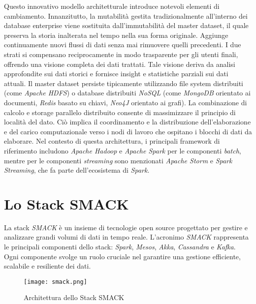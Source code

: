 Questo innovativo modello architetturale introduce notevoli elementi di cambiamento.
Innanzitutto, la mutabilità gestita tradizionalmente all'interno dei database enterprise viene sostituita dall'immutabilità del master dataset, il quale preserva la storia inalterata nel tempo nella sua forma originale.
Aggiunge continuamente nuovi flussi di dati senza mai rimuovere quelli precedenti.
I due strati si compensano reciprocamente in modo trasparente per gli utenti finali, offrendo una visione completa dei dati trattati.
Tale visione deriva da analisi approfondite sui dati storici e fornisce insight e statistiche parziali sui dati attuali.
Il master dataset persiste tipicamente utilizzando file system distribuiti (come \textit{Apache HDFS}) o database distribuiti \textit{NoSQL} (come \textit{MongoDB} orientato ai documenti, \textit{Redis} basato su chiavi, \textit{Neo4J} orientato ai grafi).
La combinazione di calcolo e storage parallelo distribuito consente di massimizzare il principio di località del dato.
Ciò implica il coordinamento e la distribuzione dell'elaborazione e del carico computazionale verso i nodi di lavoro che ospitano i blocchi di dati da elaborare.
Nel contesto di questa architettura, i principali framework di riferimento includono \textit{Apache Hadoop} \cite{hadoop} e \textit{Apache Spark} \cite{spark} per le componenti \textit{batch}, mentre per le componenti \textit{streaming} sono menzionati \textit{Apache Storm} e \textit{Spark Streaming}, che fa parte dell'ecosistema di \textit{Spark}.

\section[Stack SMACK]{Lo Stack SMACK}
La stack \textit{SMACK} è un insieme di tecnologie open source progettato per gestire e analizzare grandi volumi di dati in tempo reale.
L'acronimo \textit{SMACK} rappresenta le principali componenti dello stack: \textit{Spark}, \textit{Mesos}, \textit{Akka}, \textit{Cassandra} e \textit{Kafka}.
Ogni componente svolge un ruolo cruciale nel garantire una gestione efficiente, scalabile e resiliente dei dati.

\begin{figure}[!ht]
    \centering
    \texttt{[image: smack.png]}
    \caption[Stack SMACK]{Architettura dello Stack SMACK \cite{smack}}
\end{figure}

